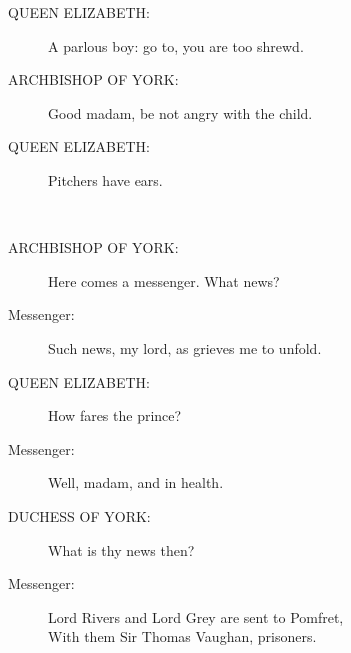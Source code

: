 \documentclass{article}
\begin{document}
\begin{description}
\item[QUEEN ELIZABETH:] 
\hspace{1pt}A parlous boy: go to, you are too shrewd.\\
\end{description}
\begin{description}
\item[ARCHBISHOP OF YORK:] 
\hspace{1pt}Good madam, be not angry with the child.\\
\end{description}
\begin{description}
\item[QUEEN ELIZABETH:] 
\hspace{1pt}Pitchers have ears.\\
\end{description}
\\
\begin{description}
\item[ARCHBISHOP OF YORK:] 
\hspace{1pt}Here comes a messenger. What news?\\
\end{description}
\begin{description}
\item[Messenger:] 
\hspace{1pt}Such news, my lord, as grieves me to unfold.\\
\end{description}
\begin{description}
\item[QUEEN ELIZABETH:] 
\hspace{1pt}How fares the prince?\\
\end{description}
\begin{description}
\item[Messenger:] 
\hspace{1pt}Well, madam, and in health.\\
\end{description}
\begin{description}
\item[DUCHESS OF YORK:] 
\hspace{1pt}What is thy news then?\\
\end{description}
\begin{description}
\item[Messenger:] 
\hspace{1pt}Lord Rivers and Lord Grey are sent to Pomfret,\\
\hspace{1pt}With them Sir Thomas Vaughan, prisoners.\\
\end{description}
\end{document}
